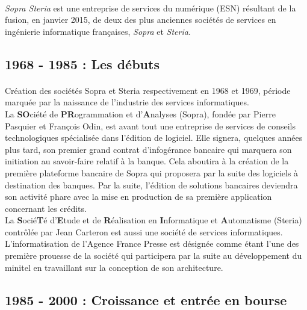 \paragraph{}
\textit{Sopra Steria} est une entreprise de services du numérique (ESN) résultant de la fusion, en janvier 2015, de deux des plus anciennes sociétés de services en ingénierie informatique françaises, \textit{Sopra} et \textit{Steria}.

\subsection{1968 - 1985 : Les débuts}

\paragraph{}
Création des sociétés Sopra et Steria respectivement en 1968 et 1969, période marquée par la naissance de l'industrie des services informatiques.\\

La \textbf{SO}ciété de \textbf{PR}ogrammation et d'\textbf{A}nalyses (Sopra), fondée par Pierre Pasquier et François Odin, est avant tout une entreprise de services de conseils technologiques spécialisée dans l'édition de logiciel. Elle signera, quelques années plus tard, son premier grand contrat d'infogérance bancaire qui marquera son initiation au savoir-faire relatif à la banque. Cela aboutira à la création de la première plateforme bancaire de Sopra qui proposera par la suite des logiciels à destination des banques. Par la suite, l'édition de solutions bancaires deviendra son activité phare avec la mise en production de sa première application concernant les crédits.\\

La \textbf{S}ocié\textbf{T}é d'\textbf{E}tude et de \textbf{R}éalisation en \textbf{I}nformatique et \textbf{A}utomatisme (Steria) contrôlée par Jean Carteron est aussi une société de services informatiques. L'informatisation de l'Agence France Presse est désignée comme étant l'une des première prouesse de la société qui participera par la suite au développement du minitel en travaillant sur la conception de son architecture.

\subsection{1985 - 2000 : Croissance et entrée en bourse}

